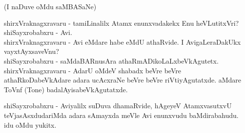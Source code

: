 (I naDuve oMdu saMBASaNe)

shirxVraknagxravaru - tamiLinalilx Atamx enunxvadakekx Enu heVLutitxVri? \\
shiSayxrobabxru - Avi. \\
shirxVraknagxravaru - Avi eMdare habe eMdU athaRvide. I AvigaLeraDakUkx vayxtAyxsaveVnu? \\
shiSayxrobabxru - saMdaBARnusAra athaRmADikoLaLxbeVkAgutetx.\\
shirxVraknagxravaru - AdarU oMdeV shabadx beVre beVre athaRkoDabeVkAdare  adara ucAcxraNe beVre beVre riVtiyAgutatxde. aMdare ToVnf ({\eng Tone}) badalAyisabeVkAgutatxde.

shiSayxrobabxru - Aviyalilx suDuva dhamaRvide, hAgeyeV AtamxvasutxvU teVjasAsxdudariMda adara sAmayxda meVle Avi enunxvudu baMdirabahudu. idu oMdu yukitx. 


